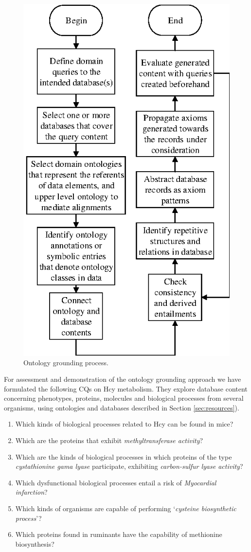 \begin{figure}[h]
\centering
\includegraphics[width=0.65\linewidth]{PIC/process}
\caption{Ontology grounding process.}
\label{fig:process}
\end{figure}

For assessment and demonstration of the ontology grounding approach we have formulated the following CQs on Hcy metabolism. They explore database content concerning phenotypes, proteins, molecules and biological processes from several organisms, using ontologies and databases described in Section \ref{sec:resources}).

\begin{enumerate}
	\item Which kinds of biological processes related to Hcy can be found in mice?
	\item Which are the proteins that exhibit  \textit{methyltransferase activity}? 
	\item Which are the kinds of biological processes in which proteins of the type \textit{cystathionine gama lyase} participate, exhibiting \textit{carbon-sulfur lyase activity}?
	\item Which dysfunctional biological processes entail a risk of \textit{Myocardial infarction}?
	\item Which kinds of organisms are capable of performing `\textit{cysteine biosynthetic process}'?
	\item Which proteins found in ruminants have the capability of methionine biosynthesis? 
\end{enumerate}

